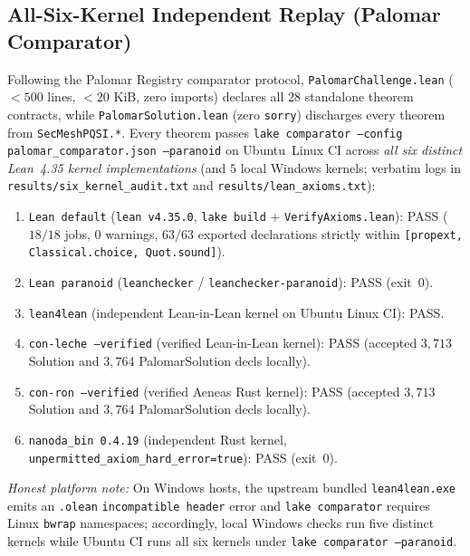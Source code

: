 \documentclass[11pt,reqno]{amsart}
\theoremstyle{definition}
\newcommand{\code}[1]{\texttt{\small #1}}
\begin{document}
\subsection*{All-Six-Kernel Independent Replay (Palomar Comparator)}
Following the Palomar Registry comparator protocol, \code{PalomarChallenge.lean} ($<500$ lines, $<20\text{ KiB}$, zero imports) declares all $28$ standalone theorem contracts, while \code{PalomarSolution.lean} (zero \code{sorry}) discharges every theorem from \code{SecMeshPQSI.*}.
Every theorem passes \code{lake comparator --config palomar\_comparator.json --paranoid} on Ubuntu~Linux CI across \emph{all six distinct Lean~4.35 kernel implementations} (and $5$ local Windows kernels; verbatim logs in \code{results/six\_kernel\_audit.txt} and \code{results/lean\_axioms.txt}):
\begin{enumerate}[leftmargin=1.8em]
  \item \code{Lean default} (\code{lean v4.35.0}, \code{lake build} + \code{VerifyAxioms.lean}): PASS ($18/18$ jobs, $0$ warnings, $63/63$ exported declarations strictly within \code{[propext, Classical.choice, Quot.sound]}).
  \item \code{Lean paranoid} (\code{leanchecker} / \code{leanchecker-paranoid}): PASS (exit~$0$).
  \item \code{lean4lean} (independent Lean-in-Lean kernel on Ubuntu Linux CI): PASS.
  \item \code{con-leche --verified} (verified Lean-in-Lean kernel): PASS (accepted $3{,}713$ Solution and $3{,}764$ PalomarSolution decls locally).
  \item \code{con-ron --verified} (verified Aeneas Rust kernel): PASS (accepted $3{,}713$ Solution and $3{,}764$ PalomarSolution decls locally).
  \item \code{nanoda\_bin 0.4.19} (independent Rust kernel, \code{unpermitted\_axiom\_hard\_error=true}): PASS (exit~$0$).
\end{enumerate}
\emph{Honest platform note:} On Windows hosts, the upstream bundled \code{lean4lean.exe} emits an \code{.olean} \code{incompatible header} error and \code{lake comparator} requires Linux \code{bwrap} namespaces; accordingly, local Windows checks run five distinct kernels while Ubuntu CI runs all six kernels under \code{lake comparator --paranoid}.
\end{document}
